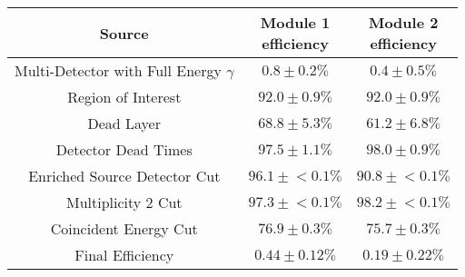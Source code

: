 \begin{tabular}{|c|c|c|}
\hline
  Source & \makecell{Module 1\\efficiency} & \makecell{Module 2\\efficiency} \\
\hline
  \makecell{Multi-Detector with\\Full Energy $\gamma$} & $0.8 \pm 0.2\%$ & $0.4 \pm 0.5\%$ \\
  Region of Interest & $92.0 \pm 0.9\%$ & $92.0 \pm 0.9\%$ \\
  Dead Layer & $68.8 \pm 5.3\%$ & $61.2 \pm 6.8\%$ \\
  Detector Dead Times & $97.5 \pm 1.1\%$ & $98.0 \pm 0.9\%$ \\
  Enriched Source Detector Cut & $96.1 \pm{}<\!0.1\%$ & $90.8 \pm{}<\!0.1\%$ \\
  Multiplicity 2 Cut & $97.3 \pm{}<\!0.1\%$ & $98.2 \pm{}<\!0.1\%$ \\
  Coincident Energy Cut & $76.9 \pm 0.3\%$ & $75.7 \pm 0.3\%$ \\
  \hline Final Efficiency & $0.44 \pm 0.12\%$ & $0.19 \pm 0.22\%$ \\
\hline
\end{tabular}
